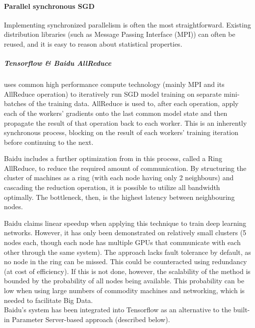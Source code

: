 \paragraph{Parallel synchronous SGD}

Implementing synchronized parallelism is often the most straightforward. Existing distribution libraries (such as Message Passing Interface (MPI)) can often be reused, and it is easy to reason about statistical properties. 

\subparagraph{Tensorflow \& Baidu AllReduce \citep{BaiduAllReduce2017}}

uses common high performance compute technology (mainly MPI and its AllReduce operation) to iteratively run SGD model training on separate mini-batches of the training data. AllReduce is used to, after each operation, apply each of the workers’ gradients onto the last common model state and then propagate the result of that operation back to each worker. This is an inherently synchronous process, blocking on the result of each workers’ training iteration before continuing to the next.

Baidu includes a further optimization from \citet{Patarasuk2009} in this process, called a Ring AllReduce, to reduce the required amount of communication. By structuring the cluster of machines as a ring (with each node having only 2 neighbours) and cascading the reduction operation, it is possible to utilize all bandwidth optimally. The bottleneck, then, is the highest latency between neighbouring nodes.

Baidu claims linear speedup when applying this technique to train deep learning networks. However, it has only been demonstrated on relatively small clusters (5 nodes each, though each node has multiple GPUs that communicate with each other through the same system). The approach lacks fault tolerance by default, as no node in the ring can be missed. This could be counteracted using redundancy (at cost of efficiency). If this is not done, however, the scalability of the method is bounded by the probability of all nodes being available. This probability can be low when using large numbers of commodity machines and networking, which is needed to facilitate Big Data.\\
Baidu's system has been integrated into Tensorflow as an alternative to the built-in Parameter Server-based approach (described below).


